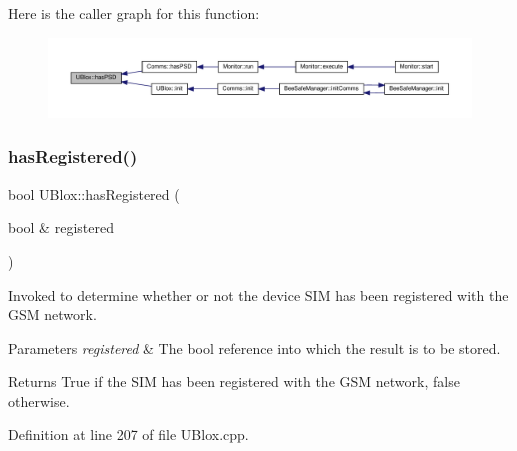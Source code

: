 Here is the caller graph for this function\+:\nopagebreak
\begin{figure}[H]
\begin{center}
\leavevmode
\includegraphics[width=350pt]{da/df6/class_u_blox_ae49b51a602a327b5eff5b04d2ccaec20_icgraph}
\end{center}
\end{figure}
\mbox{\label{class_u_blox_a1889c2b9bb6087bc939bd2a27b68623b}} 
\subsubsection{\texorpdfstring{has\+Registered()}{hasRegistered()}}
{\footnotesize\ttfamily bool U\+Blox\+::has\+Registered (\begin{DoxyParamCaption}\item[{bool \&}]{registered }\end{DoxyParamCaption})}

Invoked to determine whether or not the device S\+IM has been registered with the G\+SM network.


\begin{DoxyParams}{Parameters}
{\em registered} & The bool reference into which the result is to be stored. \\
\hline
\end{DoxyParams}
\begin{DoxyReturn}{Returns}
True if the S\+IM has been registered with the G\+SM network, false otherwise. 
\end{DoxyReturn}


Definition at line 207 of file U\+Blox.\+cpp.


